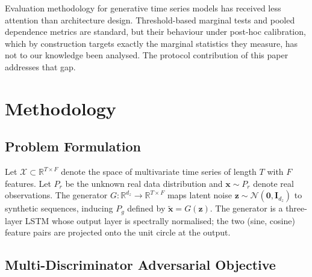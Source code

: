 \documentclass[preprint,12pt]{elsarticle}
\newcommand{\R}{\mathbb{R}}
\newcommand{\Preal}{P_r}
\newcommand{\Pg}{P_g}
\begin{document}
\medskip
Evaluation methodology for generative time series models has received
less attention than architecture design.  Threshold-based marginal tests
and pooled dependence metrics are standard, but their behaviour under
post-hoc calibration, which by construction targets exactly the marginal
statistics they measure, has not to our knowledge been analysed.  The
protocol contribution of this paper addresses that gap.

\section{Methodology}
\label{sec:method}

\subsection{Problem Formulation}

Let $\mathcal{X} \subset \R^{T \times F}$ denote the space of multivariate
time series of length $T$ with $F$ features.  Let $\Preal$ be the unknown
real data distribution and $\mathbf{x} \sim \Preal$ denote real
observations.  The generator $G: \R^{d_z} \to \R^{T \times F}$ maps latent
noise $\mathbf{z} \sim \mathcal{N}(\mathbf{0}, \mathbf{I}_{d_z})$ to
synthetic sequences, inducing $\Pg$ defined by
$\tilde{\mathbf{x}} = G(\mathbf{z})$.  The generator is a three-layer LSTM
whose output layer is spectrally normalised; the two (sine, cosine)
feature pairs are projected onto the unit circle at the output.

\subsection{Multi-Discriminator Adversarial Objective}
\end{document}

